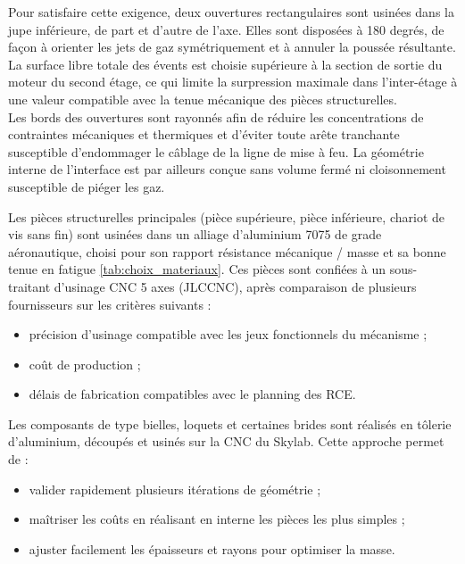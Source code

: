 Pour satisfaire cette exigence, deux ouvertures rectangulaires sont usinées dans la jupe inférieure, de part et d'autre de
l'axe. Elles sont disposées à 180 degrés, de façon à orienter les jets de gaz symétriquement et à annuler la poussée résultante.
La surface libre totale des évents est choisie supérieure à la section de sortie du moteur du second étage, ce qui limite la
surpression maximale dans l'inter-étage à une valeur compatible avec la tenue mécanique des pièces structurelles.\\

Les bords des ouvertures sont rayonnés afin de réduire les concentrations de contraintes mécaniques et thermiques et d'éviter
toute arête tranchante susceptible d'endommager le câblage de la ligne de mise à feu. La géométrie interne de l'interface est
par ailleurs conçue sans volume fermé ni cloisonnement susceptible de piéger les gaz.


Les pièces structurelles principales (pièce supérieure, pièce inférieure, chariot de vis sans fin) sont usinées dans un alliage
d'aluminium 7075 de grade aéronautique, choisi pour son rapport résistance mécanique / masse et sa bonne tenue en fatigue
\ref{tab:choix_materiaux}. Ces pièces sont confiées à un sous-traitant d'usinage \acrshort{CNC} 5 axes (JLCCNC), après
comparaison de plusieurs fournisseurs sur les critères suivants :
\begin{itemize}
    \item précision d'usinage compatible avec les jeux fonctionnels du mécanisme ;
    \item coût de production ;
    \item délais de fabrication compatibles avec le planning des \acrshort{RCE}.\\
\end{itemize}

Les composants de type bielles, loquets et certaines brides sont réalisés en tôlerie d'aluminium, découpés et usinés sur la
\acrshort{CNC} du \gls{Skylab}. Cette approche permet de :
\begin{itemize}
    \item valider rapidement plusieurs itérations de géométrie ;
    \item maîtriser les coûts en réalisant en interne les pièces les plus simples ;
    \item ajuster facilement les épaisseurs et rayons pour optimiser la masse.\\
\end{itemize}

